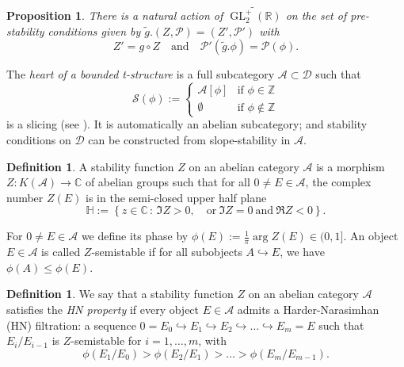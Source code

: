 \documentclass[leqno,11pt,twoside]{amsart}
\newtheorem{Prop}[Thm]{Proposition}
\theoremstyle{definition}
\newtheorem{Def}[Thm]{Definition}
\begin{document}
\begin{Prop} There is a natural action of ${\widetilde{{\mathop{\mathrm{GL}}\nolimits}_2^+({\ensuremath{\mathbb{R}}})}}$ on the set of pre-stability conditions given by
$\tilde g.(Z, {\ensuremath{\mathcal P}}) = (Z', {\ensuremath{\mathcal P}}')$ with
\[ 
Z' = g \circ Z \quad \text{and} \quad
{\ensuremath{\mathcal P}}'(\tilde g.\phi) = {\ensuremath{\mathcal P}}(\phi). \]
\end{Prop}

The \emph{heart of a bounded t-structure} is a full subcategory ${\ensuremath{\mathcal A}} \subset {\ensuremath{\mathcal D}}$ such that
\[ 
{\ensuremath{\mathcal S}}(\phi) := \begin{cases} {\ensuremath{\mathcal A}}[\phi] & \text{if $\phi \in {\ensuremath{\mathbb{Z}}}$} \\
			\emptyset & \text{if $\phi \notin {\ensuremath{\mathbb{Z}}}$} \end{cases}
\]
is a slicing (see \cite[Lemma 3.2]{Bridgeland:Stab}). It is automatically an abelian subcategory; 
and stability conditions on ${\ensuremath{\mathcal D}}$ can be constructed from slope-stability in ${\ensuremath{\mathcal A}}$.

\begin{Def}
A stability function $Z$ on an abelian category ${\ensuremath{\mathcal A}}$ is a morphism
$Z \colon K({\ensuremath{\mathcal A}}) \to {\ensuremath{\mathbb{C}}}$ of abelian groups such that for all $0 \neq E \in {\ensuremath{\mathcal A}}$, the complex number 
$Z(E)$ is in the semi-closed upper half plane
\[  {\ensuremath{\mathbb{H}}}:= {\left\{{z \in {\ensuremath{\mathbb{C}}}}\,\colon\,{\Im Z > 0,  \quad \text{or} \ \Im Z = 0 \ \text{and} \ \Re Z < 0}\right\}}.
\]
\end{Def}

For $ 0 \neq E \in {\ensuremath{\mathcal A}}$ we define its phase by $\phi(E) := \frac 1\pi \arg Z(E) \in (0,1]$.
An object $E \in {\ensuremath{\mathcal A}}$ is called $Z$-semistable if for all
subobjects $A {\ensuremath{\hookrightarrow}} E$, we have $\phi(A) \le \phi(E)$. 

\begin{Def} We say that a stability function $Z$ on an abelian category ${\ensuremath{\mathcal A}}$ satisfies the
\emph{HN property} if every object $E \in {\ensuremath{\mathcal A}}$ admits a Harder-Narasimhan (HN) filtration: a
sequence $0 = E_0 {\ensuremath{\hookrightarrow}} E_1 {\ensuremath{\hookrightarrow}} E_2 {\ensuremath{\hookrightarrow}} \dots {\ensuremath{\hookrightarrow}} E_m = E$ such that
$E_i/E_{i-1}$ is $Z$-semistable for $i = 1, \dots, m$, with
\[ \phi\left(E_1/E_0\right) > \phi\left(E_2/E_1\right) > \dots > \phi\left(E_m/E_{m-1}\right). \]
\end{Def}
\end{document}
